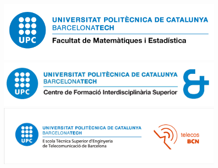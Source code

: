 \begin{titlepage}
	
	\begin{figure}[h]
	\centering
  \begin{minipage}{0.45\linewidth}
  \begin{center}
\includegraphics[width=1\linewidth]{Images/logo2.png}
\end{center}
  \end{minipage} 
  \begin{minipage}{0.45\linewidth}
  \begin{center}
\includegraphics[width=1\linewidth]{Images/logo1.jpg}
\end{center}
  \end{minipage} 
   \begin{minipage}{0.45\linewidth}
  \begin{center}
\includegraphics[width=1\linewidth]{Images/logo3.png}
\end{center}
  \end{minipage} 
\end{figure}
\vspace{1cm}


\end{titlepage}
